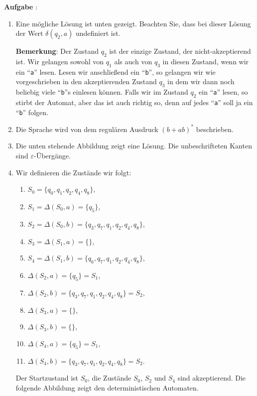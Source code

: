 \documentclass{article}
\newcounter{aufgabe}
\newcommand{\exercise}{\vspace*{0.3cm}
\stepcounter{aufgabe}

\noindent
\textbf{Aufgabe \arabic{aufgabe}}: }
\begin{document}
\exercise
\begin{enumerate}
\item Eine m\"ogliche L\"osung ist unten gezeigt. Beachten Sie, dass bei dieser L\"osung
      der Wert $\delta(q_2,a)$ undefiniert ist.

 
      \textbf{Bemerkung}: Der Zustand $q_2$ ist der einzige Zustand, der nicht-akzeptierend ist. 
      Wir gelangen sowohl von $q_1$ als auch von $q_3$ in diesen Zustand,
      wenn wir ein ``\texttt{a}'' lesen.  Lesen wir anschlie{\ss}end ein ``\texttt{b}'',
      so gelangen wir wie vorgeschrieben in den akzeptierenden Zustand $q_3$ in dem wir
      dann noch beliebig viele ``\texttt{b}''s einlesen k\"onnen.   Falls wir im Zustand
      $q_2$ ein ``\texttt{a}'' lesen, so stirbt der Automat, aber das ist auch richtig so,
      denn auf jedes ``\texttt{a}'' soll ja ein ``\texttt{b}'' folgen.
\item Die Sprache wird von dem regul\"aren Ausdruck $(b+ab)^*$ beschrieben.
\item Die unten stehende Abbildung zeigt eine L\"osung.  Die unbeschrifteten Kanten sind
      $\varepsilon$-\"Uberg\"ange.

\item Wir definieren die Zust\"ande wir folgt:
      \begin{enumerate}
      \item $S_0 = \{ q_0, q_1, q_2, q_4, q_8 \}$,
      \item $S_1 = \Delta(S_0, a) = \{ q_5 \}$,
      \item $S_2 = \Delta(S_0, b) = \{ q_3, q_7, q_1, q_2, q_4, q_8 \}$,
      \item $S_3 = \Delta(S_1, a) = \{ \}$,
      \item $S_4 = \Delta(S_1, b) = \{ q_6, q_7, q_1, q_2, q_4, q_8 \}$,
      \item $\Delta(S_2, a) = \{ q_5 \} = S_1$,
      \item $\Delta(S_2, b) = \{ q_3, q_7, q_1, q_2, q_4, q_8 \} = S_2$,
      \item $\Delta(S_3, a) = \{ \}$,
      \item $\Delta(S_3, b) = \{ \}$,
      \item $\Delta(S_4, a) = \{ q_5 \} = S_1$,
      \item $\Delta(S_4, b) = \{ q_3, q_7, q_1, q_2, q_4, q_8 \} = S_2$.
      \end{enumerate}
      Der Startzustand ist $S_0$, die Zust\"ande $S_0$, $S_2$ und $S_4$ sind akzeptierend.
      Die folgende Abbildung zeigt den deterministischen Automaten.


\end{enumerate}
\end{document}

